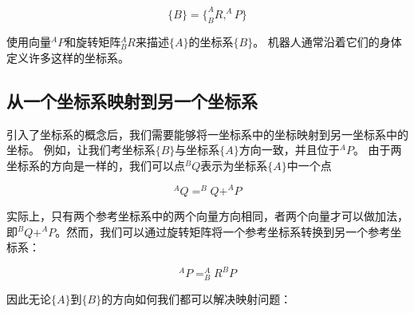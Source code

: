 \begin{equation}
\{B\}=\{^A_BR, ^AP\}
\end{equation}
%

使用向量$^AP$和旋转矩阵$^A_BR$来描述$\{A\}$的坐标系$\{B\}$。 机器人通常沿着它们的身体定义许多这样的坐标系。

\subsection{从一个坐标系映射到另一个坐标系}


引入了坐标系的概念后，我们需要能够将一坐标系中的坐标映射到另一坐标系中的坐标。 例如，让我们考坐标系$ \{B \} $与坐标系$ \{A \} $方向一致，并且位于$ ^ AP $。 由于两坐标系的方向是一样的，我们可以点$ ^ BQ $表示为坐标系$ \{A \} $中一个点

%
\begin{equation}
^AQ=^BQ+^AP
\end{equation}
%

实际上，只有两个参考坐标系中的两个向量方向相同，者两个向量才可以做加法，即$ ^ BQ + ^ AP $。然而，我们可以通过旋转矩阵将一个参考坐标系转换到另一个参考坐标系：

\begin{equation}
^AP=^A_BR^BP
\end{equation}
%

因此无论$\{A\}$到$ \{B\} $的方向如何我们都可以解决映射问题：

